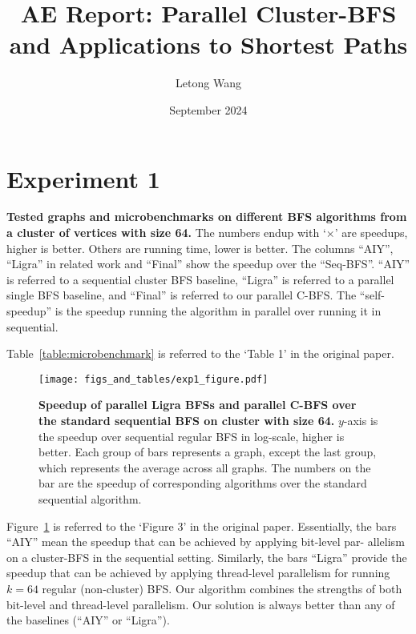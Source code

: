 \documentclass{article}
\title{AE Report: Parallel Cluster-BFS and Applications to Shortest Paths}
\author{Letong Wang}
\date{September 2024}
\begin{document}
\maketitle

\section{Experiment 1}
\begin{table}[htbp]
  \centering
  \footnotesize
  
  \caption{\small\textbf{
    Tested graphs and microbenchmarks on different BFS algorithms from a cluster of vertices with size 64. 
  }
  The numbers endup with `$\times$' are speedups, higher is better. Others are running time, lower is better. The columns ``AIY'', ``Ligra'' in related work and ``Final'' show the speedup over the ``Seq-BFS''. ``AIY'' is referred to a sequential cluster BFS baseline, ``Ligra'' is referred to a parallel single BFS baseline, and ``Final'' is referred to our parallel C-BFS.  The ``self-speedup'' is the speedup running the algorithm in parallel over running it in sequential. 
  \label{table:microbenchmark}
  }
\end{table}
Table~\ref{table:microbenchmark} is referred to the `Table 1' in the original paper.

\begin{figure}[htbp]
  \centering
  \texttt{[image: figs\_and\_tables/exp1\_figure.pdf]}
  \caption{\small\textbf{Speedup of parallel Ligra BFSs and parallel C-BFS over the standard sequential BFS on cluster with size 64.} $y$-axis is the speedup over sequential regular BFS in log-scale, higher is better. Each group of bars represents a graph, except the last group, which represents the average across all graphs. The numbers on the bar are the speedup of corresponding algorithms over the standard sequential algorithm.  
  \label{fig:par_compare}
  }
\end{figure} 
Figure~\ref{fig:par_compare} is referred to the `Figure 3' in the original paper. Essentially, the bars ``AIY'' mean the speedup that can be achieved by applying bit-level par- allelism on a cluster-BFS in the sequential setting. Similarly, the bars ``Ligra'' provide the speedup that can be achieved by applying thread-level parallelism for running $k = 64$ regular (non-cluster) BFS. 
Our algorithm combines the strengths of both bit-level and thread-level parallelism. Our solution is always better than any of the baselines (``AIY'' or  ``Ligra'').
\end{document}
